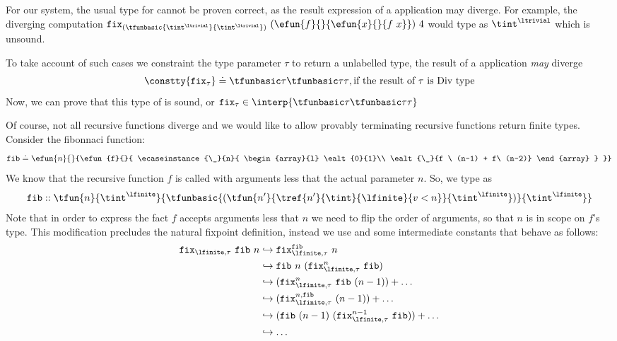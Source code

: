 For our system, the usual type for \efix{\tau}
cannot be proven correct, 
as the result expression of a \efix{\tau}
application may diverge.
%
For example, the diverging computation
$\efix{{(\tfunbasic{\tint^\ltrivial}{\tint^\ltrivial})}}\ 
	(\efun{f}{}{\efun{x}{}{f\ x}})\  4$
would type as $\tint^\ltrivial$
which is unsound.

To take account of such cases we constraint 
the type parameter $\tau$ to return a unlabelled type,
\ie the result of a \efix{\tau} application \textit{may}
diverge
%
$$\constty{\efix{\tau}} \doteq {\fixtype{\tau}}, 
	\text{if the result of}\ \tau\ \text{is Div type}$$
%
Now, we can prove that this type of \efix{\tau}
is sound, or $\efix{\tau} \in \interp{\fixtype{\tau}}$

%
Of course, not all recursive functions diverge
and we would like to allow provably terminating 
recursive functions return finite types.
%
Consider the fibonnaci function:
$$
\efib \doteq
\efun{n}{}{\efun{f}{}{
	\ecaseinstance{\_}{n}{
		 \begin{array}{l}
			 \ealt{0}{1}\\ 
			 \ealt{\_}{f \ (n-1) + f\ (n-2)}	
		\end{array}
	}
}}$$
We know that the recursive function $f$ 
is called with arguments less that the actual parameter $n$.
So, we type \efib as
$$
\efib :: \tfun{n}{\tint^\lfinite}{
			\tfunbasic{(\tfun{n'}{\tref{n'}{\tint}{\lfinite}{v < n}}{\tint^\lfinite})}
			{\tint^\lfinite}
			}
$$
%
Note that in order to express the fact $f$ accepts arguments less that 
$n$ we need to flip the order of arguments, so that $n$ is in scope on $f$'s type.
%
This modification precludes the natural fixpoint definition, 
instead we use \etfix{\tau} and some intermediate constants
that behave as follows:
%
\begin{align*}
\etfix{\tau}\ \efib\ n 
& \hookrightarrow
	\etfixf{\tau}{\efib}{??}\ n \\
& \hookrightarrow
    \efib\ n\ (\etfixn{\tau}{\efib}{n}\ \efib) \\
& \hookrightarrow
    (\etfixn{\tau}{f}{n}\ \efib \ (n-1))  + \dots \\
& \hookrightarrow
    (\etfixfn{\tau}{\efib}{n}\ (n-1)) + \dots \\
& \hookrightarrow
    (\efib\ (n-1)\ (\etfixn{\tau}{\efib}{n-1}\ \efib)) 
    +\dots \\
& \hookrightarrow \dots
\end{align*}
